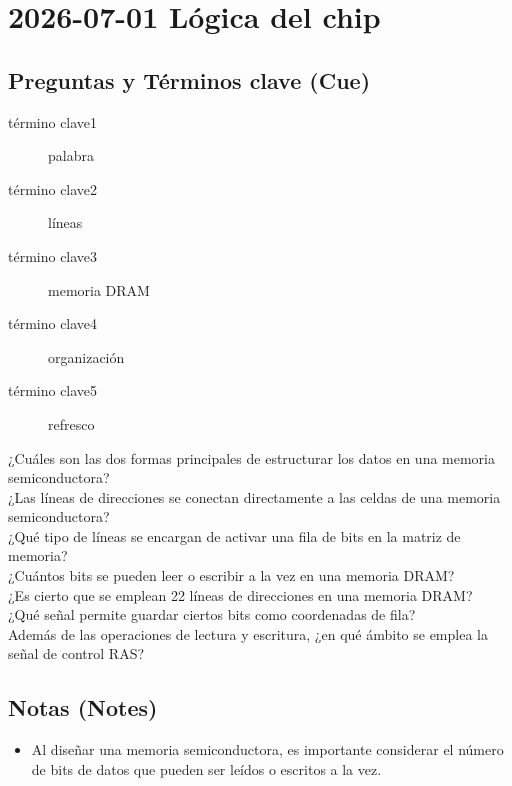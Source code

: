 \documentclass{article}
\begin{document}
\section{2026-07-01 Lógica del chip}
\label{sec:orgd488921}

\subsection{Preguntas y Términos clave (Cue)}
\label{sec:orgba97eba}
\begin{description}
\item[{término clave1}] palabra
\item[{término clave2}] líneas
\item[{término clave3}] memoria DRAM
\item[{término clave4}] organización
\item[{término clave5}] refresco
\item[{¿Cuáles son las dos formas principales de estructurar los datos en una memoria semiconductora?}] 

\item[{¿Las líneas de direcciones se conectan directamente a las celdas de una memoria semiconductora?}] 

\item[{¿Qué tipo de líneas se encargan de activar una fila de bits en la matriz de memoria?}] 

\item[{¿Cuántos bits se pueden leer o escribir a la vez en una memoria DRAM?}] 

\item[{¿Es cierto que se emplean 22 líneas de direcciones en una memoria DRAM?}] 

\item[{¿Qué señal permite guardar ciertos bits como coordenadas de fila?}] 

\item[{Además de las operaciones de lectura y escritura, ¿en qué ámbito se emplea la señal de control RAS?}] 
\end{description}

\subsection{Notas (Notes)}
\label{sec:org8889355}
\begin{itemize}
\item Al diseñar una memoria semiconductora, es importante considerar
el número de bits de datos que pueden ser leídos o escritos a la
vez.
\end{itemize}
\end{document}
